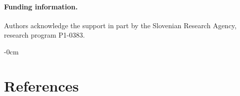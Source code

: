 \documentclass[algorithms,article,submit,pdftex,moreauthors]{Definitions/mdpi}
\begin{document}









\paragraph{\textbf{Funding information.}} Authors acknowledge the 
support in part by the Slovenian Research Agency, research program P1-0383.

\nolinenumbers

\newpage
\begin{adjustwidth}{-\extralength}{0cm}
\section*{References}


\end{adjustwidth}
\end{document}
